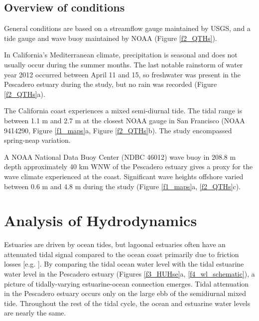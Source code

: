 \subsection{Overview of conditions\label{sub:ext_cond}}

General conditions are based on a streamflow gauge maintained by USGS,
and a tide gauge and wave buoy maintained by NOAA (Figure \ref{f2_QTHs}). 

In California's Mediterranean climate, precipitation is seasonal and
does not usually occur during the summer months. The last notable
rainstorm of water year 2012 occurred between April 11 and 15, so
freshwater was present in the Pescadero estuary during the study,
but no rain was recorded (Figure \ref{f2_QTHs}a). 

The California coast experiences a mixed semi-diurnal tide. The tidal
range is between 1.1 m and 2.7 m at the closest NOAA gauge in San
Francisco (NOAA 9414290, Figure \ref{f1_maps}a, Figure \ref{f2_QTHs}b).
The study encompassed spring-neap variation.

A NOAA National Data Buoy Center (NDBC 46012)\emph{ }wave buoy in
208.8 m depth approximately 40 km WNW of the Pescadero estuary gives
a proxy for the wave climate experienced at the coast. Significant
wave heights offshore varied between 0.6 m and 4.8 m during the study
(Figure \ref{f1_maps}a, \ref{f2_QTHs}c). 





\section{Analysis of Hydrodynamics}

Estuaries are driven by ocean tides, but lagoonal estuaries often
have an attenuated tidal signal compared to the ocean coast primarily
due to friction losses {[}e.g. \citealp{rydberg_and_wickbom_1996}{]}.
By comparing the tidal ocean water level with the tidal estuarine
water level in the Pescadero estuary (Figures \ref{f3_HUHse}a, \ref{f4_wl_schematic}),
a picture of tidally-varying estuarine-ocean connection emerges. Tidal
attenuation in the Pescadero estuary occurs only on the large ebb
of the semidiurnal mixed tide. Throughout the rest of the tidal cycle,
the ocean and estuarine water levels are nearly the same.

